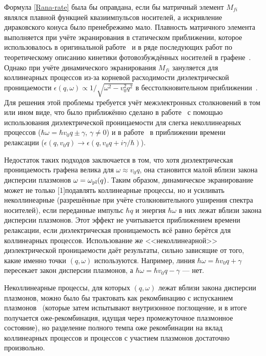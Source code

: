 Формула \eqref{Rana-rate} была бы оправдана, если бы матричный элемент $M_{fi}$ являлся плавной функцией квазиимпульсов носителей, а искривление дираковского конуса было пренебрежимо мало. Плавность матричного элемента выполняется при учёте экранирования в статическом приближении, которое использовалось в оригинальной работе~\cite{Rana-Auger} и в ряде последующих работ по теоретическому описанию кинетики фотовозбуждённых носителей в графене~\cite{Malic-kinetics,Malic-Auger,Malic2017}. Однако при учёте динамического экранирования $M_{fi}$ зануляется для коллинеарных процессов из-за корневой расходимости диэлектрической проницаемости $\epsilon(q,\omega) \propto 1/\sqrt{\omega^2 - v_0^2 q^2}$ в бесстолкновительном приближении~\cite{Finite-temperature_polarizability}. Для решения этой проблемы требуется учёт межэлектронных столкновений в том или ином виде, что было приближённо сделано в работе~\cite{Tomadin-theory} с помощью использования диэлектрической проницаемости для слегка неколлинеарных процессов ($\hbar\omega = \hbar v_0 q \pm  \gamma$, $\gamma \neq 0$) и в работе~\cite{Malic-dynamic} в приближении времени релаксации ($\epsilon(q,v_0 q) \rightarrow \epsilon(q,v_0 q + i\gamma/\hbar)$).

Недостаток таких подходов заключается в том, что хотя диэлектрическая проницаемость графена велика для $\omega \approx v_0 q$, она становится малой вблизи закона дисперсии плазмонов $\omega = \omega_{\rm pl}(q)$. Таким образом, динамическое экранирование может не только \scalebox{0.816}[1]{подавлять} коллинеарные процессы, но и усиливать неколлинеарные (разрешённые при учёте столкновительного уширения спектра носителей), если переданные импульс $\hbar q$ и энергия $\hbar \omega$ в них лежат вблизи закона дисперсии плазмонов. Этот эффект не учитывается приближением времени релаксации, если диэлектрическая проницаемость всё равно берётся для коллинеарных процессов. Использование же <<неколлинеарной>> диэлектрической проницаемости даёт результаты, сильно зависящие от того, какие именно точки $(q, \omega)$ используются. Например, линия $\hbar\omega = \hbar v_0 q +  \gamma$ пересекает закон дисперсии плазмонов, а $\hbar\omega = \hbar v_0 q -  \gamma$ --- нет.

Неколлинеарные процессы, для которых $(q, \omega)$ лежат вблизи закона дисперсии плазмонов, можно было бы трактовать как рекомбинацию с испусканием плазмонов~\cite{Rana-plasmons} (которые затем испытывают внутризонное поглощение, и в итоге получается оже-рекомбинация, идущая через промежуточное плазмонное состояние), но разделение полного темпа оже рекомбинации на вклад коллинеарных процессов и процессов с участием плазмонов достаточно произвольно.

